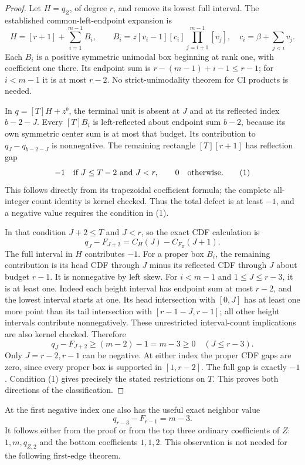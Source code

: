\begin{proof}
Let $H=q_Z$, of degree $r$, and remove its lowest full
interval. The established common-left-endpoint expansion is
\[
 H=[r+1]+\sum_{i=1}^{m-1}B_i,
 \qquad B_i=z[v_i-1][c_i]\prod_{j=i+1}^{m-1}[v_j],
 \quad c_i=\beta+\sum_{j<i}v_j.
\]
Each $B_i$ is a positive symmetric unimodal box beginning
at rank one, with coefficient one there. Its endpoint sum
is $r-(m-1)+i-1\le r-1$; for $i<m-1$ it is at most
$r-2$. No strict-unimodality theorem for CI products is needed.

In $q=[T]H+z^b$, the terminal unit is absent at $J$
and at its reflected index $b-2-J$. Every $[T]B_i$ is
left-reflected about endpoint sum $b-2$, because its
own symmetric center sum is at most that budget.
Its contribution to $q_J-q_{b-2-J}$ is nonnegative.
The remaining rectangle $[T][r+1]$ has reflection gap
\[
 -1\quad\hbox{if }J\le T-2\hbox{ and }J<r,
 \qquad0\quad\hbox{otherwise}.                         \tag{1}
\]
This follows directly from its trapezoidal coefficient
formula; the complete all-integer count identity is
kernel checked. Thus the total defect is at least $-1$,
and a negative value requires the condition in (1).

In that condition $J+2\le T$ and $J<r$, so the exact
CDF calculation is
\[
 q_J-F_{J+2}=C_H(J)-C_{F_Z}(J+1).
\]
The full interval in $H$ contributes $-1$.
For a proper box $B_i$, the remaining contribution is
its head CDF through $J$ minus its reflected CDF through
$J$ about budget $r-1$. It is nonnegative by left skew.
For $i<m-1$ and $1\le J\le r-3$, it is at least one.
Indeed each height interval has endpoint sum at most
$r-2$, and the lowest interval starts at one. Its head
intersection with $[0,J]$ has at least one more point
than its tail intersection with $[r-1-J,r-1]$; all
other height intervals contribute nonnegatively.
These unrestricted interval-count implications are also
kernel checked. Therefore
\[
               q_J-F_{J+2}\ge(m-2)-1=m-3\ge0
                         \quad(J\le r-3).
\]
Only $J=r-2,r-1$ can be negative. At either index the
proper CDF gaps are zero, since every proper box is
supported in $[1,r-2]$. The full gap is exactly $-1$.
Condition (1) gives precisely the stated restrictions on
$T$. This proves both directions of the classification.
\end{proof}

At the first negative index one also has the useful exact
neighbor value
\[
             q_{r-3}-F_{r-1}=m-3.
\]
It follows either from the proof or from the top three
ordinary coefficients of $Z$: $1,m,q_{Z,2}$ and the
bottom coefficients $1,1,2$. This observation is not
needed for the following first-edge theorem.
